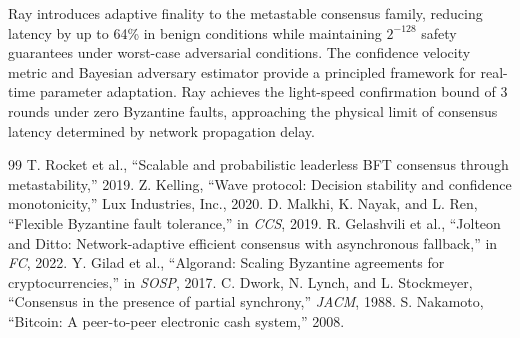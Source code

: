 \documentclass[11pt,a4paper]{article}
\begin{document}
Ray introduces adaptive finality to the metastable consensus family, reducing latency
by up to 64\% in benign conditions while maintaining $2^{-128}$ safety guarantees under
worst-case adversarial conditions. The confidence velocity metric and Bayesian adversary
estimator provide a principled framework for real-time parameter adaptation. Ray
achieves the light-speed confirmation bound of $3$ rounds under zero Byzantine faults,
approaching the physical limit of consensus latency determined by network propagation delay.

\begin{thebibliography}{99}
 T. Rocket et al., ``Scalable and probabilistic leaderless BFT consensus through metastability,'' 2019.
 Z. Kelling, ``Wave protocol: Decision stability and confidence monotonicity,'' Lux Industries, Inc., 2020.
 D. Malkhi, K. Nayak, and L. Ren, ``Flexible Byzantine fault tolerance,'' in \emph{CCS}, 2019.
 R. Gelashvili et al., ``Jolteon and Ditto: Network-adaptive efficient consensus with asynchronous fallback,'' in \emph{FC}, 2022.
 Y. Gilad et al., ``Algorand: Scaling Byzantine agreements for cryptocurrencies,'' in \emph{SOSP}, 2017.
 C. Dwork, N. Lynch, and L. Stockmeyer, ``Consensus in the presence of partial synchrony,'' \emph{JACM}, 1988.
 S. Nakamoto, ``Bitcoin: A peer-to-peer electronic cash system,'' 2008.
\end{thebibliography}
\end{document}
